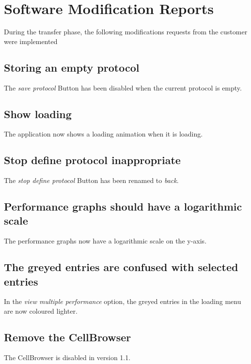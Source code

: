 \chapter{Software Modification Reports}
\label{chap:implemented}
During the transfer phase, the following modifications requests from the customer were implemented

\section*{Storing an empty protocol}
The \emph{save protocol} Button has been disabled when the current protocol is empty.

\section*{Show loading}
The application now shows a loading animation when it is loading.

\section*{Stop define protocol inappropriate}
The \emph{stop define protocol} Button has been renamed to \emph{back}.

\section*{Performance graphs should have a logarithmic scale}
The performance graphs now have a logarithmic scale on the y-axis.

\section*{The greyed entries are confused with selected entries}
In the \emph{view multiple performance} option, the greyed entries in the loading menu are now coloured lighter.

\section*{Remove the CellBrowser}
The CellBrowser is disabled in version 1.1.